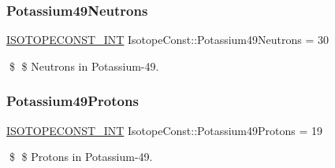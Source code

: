 \subsubsection{\texorpdfstring{Potassium49\+Neutrons}{Potassium49Neutrons}}
{\footnotesize\ttfamily \mbox{\hyperlink{group___isotope_const-_macros_ga5f18360b3e99483a35c32d789e62621c}{I\+S\+O\+T\+O\+P\+E\+C\+O\+N\+S\+T\+\_\+\+I\+NT}} Isotope\+Const\+::\+Potassium49\+Neutrons = 30}

\$ \$ Neutrons in Potassium-\/49. \mbox{\label{group___isotope_const-_potassium-_k49_ga3a7f8f7cb39e270ca8a2470b3372c9c8}} 
\subsubsection{\texorpdfstring{Potassium49\+Protons}{Potassium49Protons}}
{\footnotesize\ttfamily \mbox{\hyperlink{group___isotope_const-_macros_ga5f18360b3e99483a35c32d789e62621c}{I\+S\+O\+T\+O\+P\+E\+C\+O\+N\+S\+T\+\_\+\+I\+NT}} Isotope\+Const\+::\+Potassium49\+Protons = 19}

\$ \$ Protons in Potassium-\/49. 
